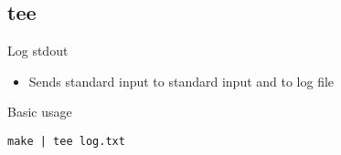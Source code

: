 \subsection{tee}

\begin{frame}[fragile]{Log stdout}
  \begin{itemize}
    \pause \item Sends standard input to standard input and to log file
  \end{itemize}
  \begin{exampleblock}{Basic usage}
    \begin{lstlisting}[showstringspaces=false,basicstyle=\tiny]
make | tee log.txt
    \end{lstlisting}
  \end{exampleblock}
\end{frame}


